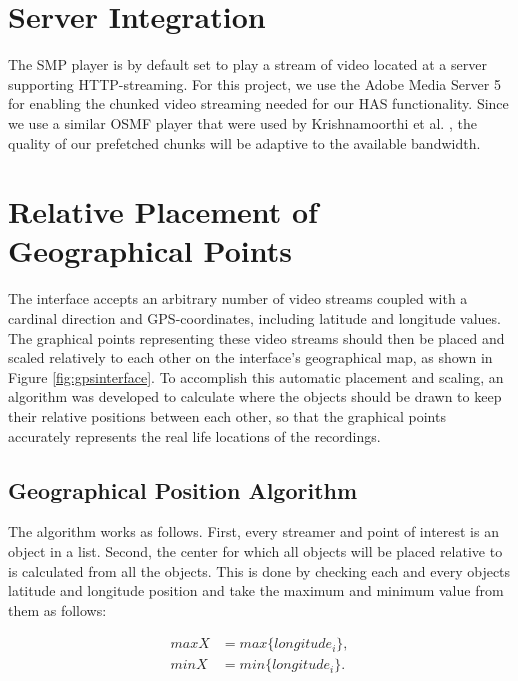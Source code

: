 \section{Server Integration}
\label{sec:serverintegration}

The SMP player is by default set to play a stream of video located at a server supporting HTTP-streaming. For this project, we use the Adobe Media Server 5 for enabling the chunked video streaming needed for our HAS functionality. Since we use a similar OSMF player that were used by Krishnamoorthi et al. \cite{hasmultipath}, the quality of our prefetched chunks will be adaptive to the available bandwidth\cite{hasmultipath}.

\section{Relative Placement of Geographical Points}
\label{sec:relativeplacement}

The interface accepts an arbitrary number of video streams coupled with a cardinal direction and GPS-coordinates, including latitude and longitude values. The graphical points representing these video streams should then be placed and scaled relatively to each other on the interface's geographical map, as shown in Figure \ref{fig:gpsinterface}. To accomplish this automatic placement and scaling, an algorithm was developed to calculate where the objects should be drawn to keep their relative positions between each other, so that the graphical points accurately represents the real life locations of the recordings.

\subsection{Geographical Position Algorithm}
\label{sec:geoalgorithm}

The algorithm works as follows. First, every streamer and point of interest is an object in a list. Second, the center for which all objects will be placed relative to is calculated from all the objects. This is done by checking each and every objects latitude and longitude position and take the maximum and minimum value from them as follows:

\begin{align}
\label{eq:maxandmin}
maxX &= max\{longitude_i\},  \\
minX &= min\{longitude_i\}. \nonumber
\end{align}
 
